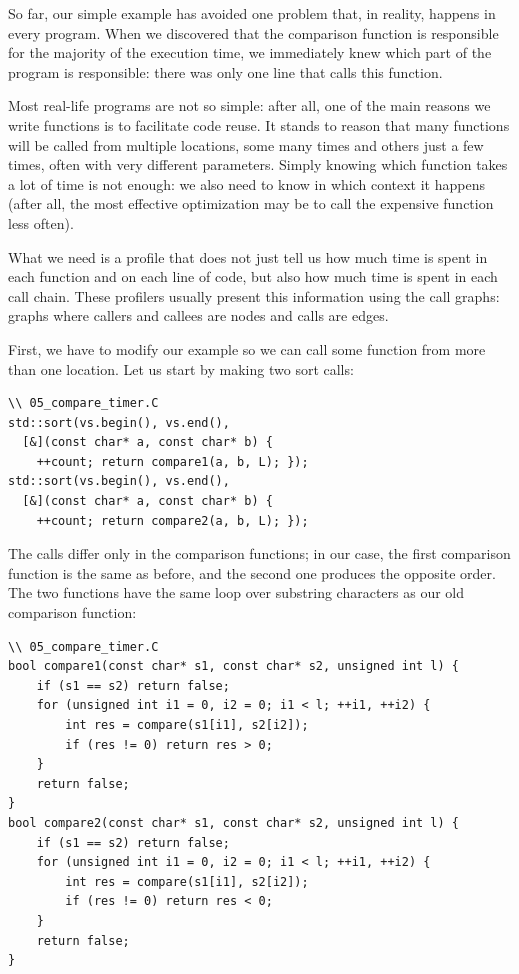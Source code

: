 
So far, our simple example has avoided one problem that, in reality, happens in every program. When we discovered that the comparison function is responsible for the majority of the execution time, we immediately knew which part of the program is responsible: there was only one line that calls this function.

Most real-life programs are not so simple: after all, one of the main reasons we write functions is to facilitate code reuse. It stands to reason that many functions will be called from multiple locations, some many times and others just a few times, often with very different parameters. Simply knowing which function takes a lot of time is not enough: we also need to know in which context it happens (after all, the most effective optimization may be to call the expensive function less often).

What we need is a profile that does not just tell us how much time is spent in each function and on each line of code, but also how much time is spent in each call chain. These profilers usually present this information using the call graphs: graphs where callers and callees are nodes and calls are edges.

First, we have to modify our example so we can call some function from more than one location. Let us start by making two sort calls:

\begin{lstlisting}[style=styleCXX]
\\ 05_compare_timer.C
std::sort(vs.begin(), vs.end(),
  [&](const char* a, const char* b) {
	++count; return compare1(a, b, L); });
std::sort(vs.begin(), vs.end(),
  [&](const char* a, const char* b) {
	++count; return compare2(a, b, L); });
\end{lstlisting}

The calls differ only in the comparison functions; in our case, the first comparison function is the same as before, and the second one produces the opposite order. The two functions have the same loop over substring characters as our old comparison function:

\begin{lstlisting}[style=styleCXX]
\\ 05_compare_timer.C
bool compare1(const char* s1, const char* s2, unsigned int l) {
	if (s1 == s2) return false;
	for (unsigned int i1 = 0, i2 = 0; i1 < l; ++i1, ++i2) {
		int res = compare(s1[i1], s2[i2]);
		if (res != 0) return res > 0;
	}
	return false;
}
bool compare2(const char* s1, const char* s2, unsigned int l) {
	if (s1 == s2) return false;
	for (unsigned int i1 = 0, i2 = 0; i1 < l; ++i1, ++i2) {
		int res = compare(s1[i1], s2[i2]);
		if (res != 0) return res < 0;
	}
	return false;
}
\end{lstlisting}


